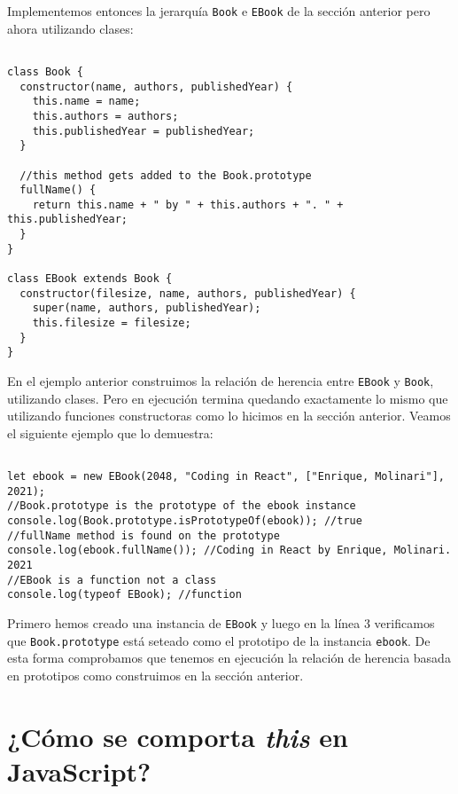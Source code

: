 \documentclass[a4paper, oneside, titlepage, 12pt]{paper}
\begin{document}
Implementemos entonces la jerarquía \texttt{Book} e \texttt{EBook} de la sección anterior pero ahora utilizando clases:

\begin{verbatim}

class Book {
  constructor(name, authors, publishedYear) {
    this.name = name;
    this.authors = authors;
    this.publishedYear = publishedYear;
  }

  //this method gets added to the Book.prototype
  fullName() {
    return this.name + " by " + this.authors + ". " + this.publishedYear;
  }
}

class EBook extends Book {
  constructor(filesize, name, authors, publishedYear) {
    super(name, authors, publishedYear);
    this.filesize = filesize;
  }
}
\end{verbatim}

En el ejemplo anterior construimos la relación de herencia entre \texttt{EBook} y \texttt{Book}, utilizando clases. Pero en ejecución termina quedando exactamente lo mismo que utilizando funciones constructoras como lo hicimos en la sección anterior. Veamos el siguiente ejemplo que lo demuestra:

\begin{verbatim}

let ebook = new EBook(2048, "Coding in React", ["Enrique, Molinari"], 2021);
//Book.prototype is the prototype of the ebook instance
console.log(Book.prototype.isPrototypeOf(ebook)); //true
//fullName method is found on the prototype
console.log(ebook.fullName()); //Coding in React by Enrique, Molinari. 2021
//EBook is a function not a class
console.log(typeof EBook); //function
\end{verbatim}

Primero hemos creado una instancia de \texttt{EBook} y luego en la línea 3 verificamos que \texttt{Book.prototype} está seteado como el prototipo de la instancia \texttt{ebook}. De esta forma comprobamos que tenemos en ejecución la relación de herencia basada en prototipos como construimos en la sección anterior.

\section{¿Cómo se comporta \textit{this} en JavaScript?} \label{meaning_of_this}
\end{document}
